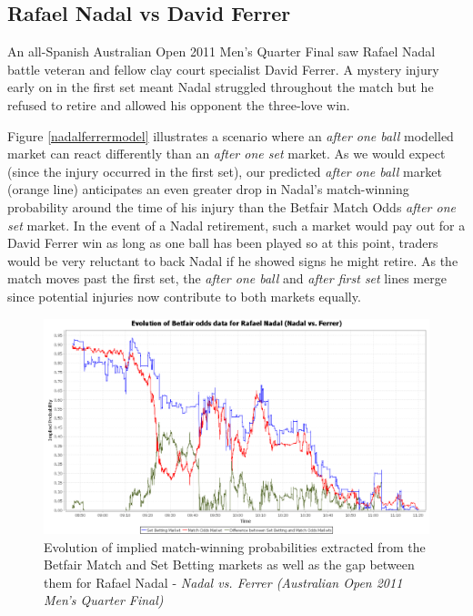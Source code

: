 \documentclass[letterpaper,12pt]{article}
\begin{document}
\subsection{Rafael Nadal vs David Ferrer}

An all-Spanish Australian Open 2011 Men's Quarter Final saw Rafael Nadal battle veteran and fellow clay court specialist David Ferrer.  A mystery injury early on in the first set meant Nadal struggled throughout the match but he refused to retire and allowed his opponent the three-love win.

Figure \ref{nadalferrermodel} illustrates a scenario where an \textit{after one ball} modelled market can react differently than an \textit{after one set} market.  As we would expect (since the injury occurred in the first set), our predicted \textit{after one ball} market (orange line) anticipates an even greater drop in Nadal's match-winning probability around the time of his injury than the Betfair Match Odds \textit{after one set} market.  In the event of a Nadal retirement, such a market would pay out for a David Ferrer win as long as one ball has been played so at this point, traders would be very reluctant to back Nadal if he showed signs he might retire.  As the match moves past the first set, the \textit{after one ball} and \textit{after first set} lines merge since potential injuries now contribute to both markets equally.

\begin{figure}[H]
  \centering \includegraphics[width=12.3cm]{matches/nadalferrer}
  \caption{Evolution of implied match-winning probabilities extracted from the Betfair Match and Set Betting markets as well as the gap between them for Rafael Nadal - \textit{Nadal vs. Ferrer (Australian Open 2011 Men's Quarter Final)}}
  \label{nadalferrer}
\end{figure}
\end{document}
